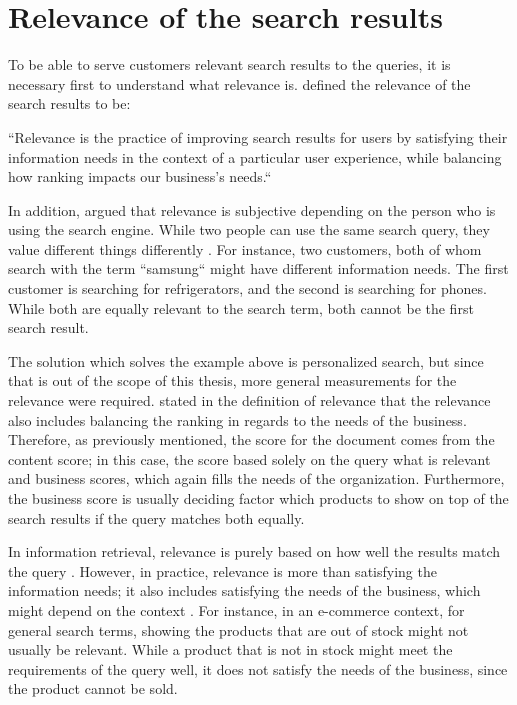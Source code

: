 \section{Relevance of the search results}
\label{sec:relevance}

To be able to serve customers relevant search results to the queries, it is necessary first to understand 
what relevance is.
\citeauthor{relevantSearch} \cite{relevantSearch} defined the relevance of the search results to be:
\begin{displayquote}
``Relevance is the practice of improving search results for users by satisfying their 
information needs in the context of a particular user experience, 
while balancing how ranking impacts our business’s needs.``
\end{displayquote}


In addition, \citeauthor{relevantSearch} \cite{relevantSearch} argued that
relevance is subjective depending on the person who is using the search engine.
While two people can use the same search query, they value different things differently \cite{relevantSearch}.
For instance, two customers, both of whom search with the term ``samsung`` might have different 
information needs. 
The first customer is searching for refrigerators, and the second is searching for phones.
While both are equally relevant to the search term, both cannot be the first search result.


The solution which solves the example above is personalized search, but since that is out of the scope
of this thesis, more general measurements for the relevance were required.
\citeauthor{relevantSearch} \cite{relevantSearch} stated in the definition of relevance that the 
relevance also includes balancing the ranking in regards to the needs of the business.
Therefore, as previously mentioned, the score for the document comes from the content score;
in this case, the score based solely on the query what is relevant and business scores,
which again fills the needs of the organization.
Furthermore, the business score is usually deciding factor which products to show on top 
of the search results if the query matches both equally.


In information retrieval, relevance is purely based on how well the results match the query 
\cite{relevantSearch}.
However, in practice, relevance is more than satisfying the information needs; 
it also includes satisfying the needs of the business, which might depend on the context 
\cite{relevantSearch}.
For instance, in an e-commerce context, for general search terms, 
showing the products that are out of stock might not usually be relevant. 
While a product that is not in stock might meet the requirements of the query well, 
it does not satisfy the needs of the business, since the product cannot be sold.



